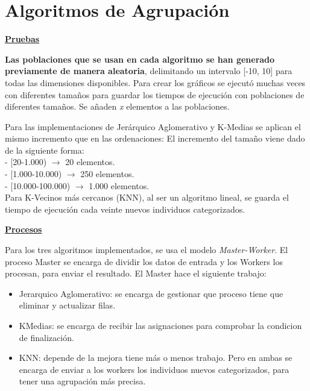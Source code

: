 \section{Algoritmos de Agrupación}

	\begin{flushleft}
	\begin{mdframed}[roundcorner=5pt]		
		\textbf{\underline{Pruebas}}
		\vspace{0.1cm}
		
		\scriptsize	
		\textbf{Las poblaciones que se usan en cada algoritmo se han generado previamente de manera aleatoria}, delimitando un intervalo [-10, 10] para todas las dimensiones disponibles. Para crear los gráficos se ejecutó muchas veces con diferentes tamaños para guardar los tiempos de ejecución con poblaciones de diferentes tamaños. Se añaden \textit{x} elementos a las poblaciones.
		
		\begin{tcolorbox}[boxrule=0.5pt, fontupper=\small]
			\scriptsize
			Para las implementaciones de Jerárquico Aglomerativo y K-Medias se aplican el mismo incremento que en las ordenaciones:
			El incremento del tamaño viene dado de la siguiente forma:\\
			- [20-1.000) $\rightarrow$ 20 elementos.\\
			- [1.000-10.000) $\rightarrow$ 250 elementos.\\
			- [10.000-100.000) $\rightarrow$ 1.000 elementos.\\
			
			Para K-Vecinos más cercanos (KNN), al ser un algoritmo lineal, se guarda el tiempo de ejecución cada veinte nuevos individuos categorizados.
			
		\end{tcolorbox}
		
		\normalsize
		
		\textbf{\underline{Procesos}}
		
		\vspace{0.1cm}
		
		\scriptsize	
		Para los tres algoritmos implementados, se usa el modelo \textit{Master-Worker}. El proceso Master se encarga de dividir los datos de entrada y los Workers los procesan, para enviar el resultado. El Master hace el siguiente trabajo:
		\begin{itemize}
			\item Jerarquico Aglomerativo: se encarga de gestionar que proceso tiene que eliminar y actualizar filas.
			\item KMedias: se encarga de recibir las asignaciones para comprobar la condicion de finalización.
			\item KNN: depende de la mejora tiene más o menos trabajo. Pero en ambas se encarga de enviar a los workers los individuos nuevos categorizados, para tener una agrupación más precisa.
		\end{itemize} 
		
		
	\end{mdframed}
	\end{flushleft}		


